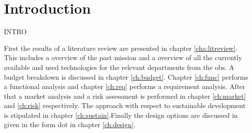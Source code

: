 \section{Introduction}\label{cha:introduction}

INTRO

First the results of a literature review are presented in chapter \ref{cha:litreview}. This includes a overview of the past mission and a overview of all the currently available and used technologies for the relevant departments from the \gls{obs}. A budget breakdown is discussed in chapter \ref{ch:budget}. Chapter \ref{ch:func} performs a functional analysis and chapter \ref{ch:req} performs a requirement analysis. After that a market analysis and a risk assessment is performed in chapter \ref{ch:market} and \ref{ch:risk} respectively. The approach with respect to sustainable development is stipulated in chapter \ref{ch:sustain}.Finally the design options are discussed in given in the form \gls{dot} in chapter \ref{ch:design}. 




